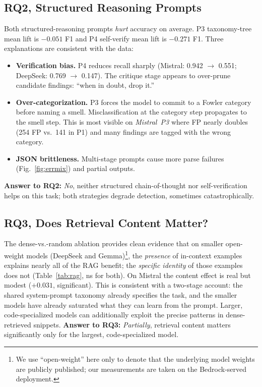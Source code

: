 \documentclass[conference]{IEEEtran}
\begin{document}
\subsection{RQ2, Structured Reasoning Prompts}
Both structured-reasoning prompts \emph{hurt} accuracy on average. P3
taxonomy-tree mean lift is $-0.051$ F1 and P4 self-verify mean lift is $-0.271$
F1. Three explanations are consistent with the data:
\begin{itemize}
 \item \textbf{Verification bias.} P4 reduces recall sharply
 (Mistral: 0.942 $\to$ 0.551; DeepSeek: 0.769 $\to$ 0.147). The critique
 stage appears to over-prune candidate findings: ``when in doubt, drop it.''
 \item \textbf{Over-categorization.} P3 forces the model to commit to a
 Fowler category before naming a smell. Misclassification at the category
 step propagates to the smell step. This is most visible on
 \textit{Mistral~P3} where FP nearly doubles (254 FP vs.\ 141 in P1) and
 many findings are tagged with the wrong category.
 \item \textbf{JSON brittleness.} Multi-stage prompts cause more parse
 failures (Fig.~\ref{fig:errmix}) and partial outputs.
\end{itemize}
\noindent\textbf{Answer to RQ2:} \emph{No}, neither structured chain-of-thought
nor self-verification helps on this task; both strategies degrade detection,
sometimes catastrophically.

\subsection{RQ3, Does Retrieval Content Matter?}
The dense-vs.-random ablation provides clean evidence that on smaller
open-weight models (DeepSeek and Gemma)\footnote{We use ``open-weight''
here only to denote that the underlying model weights are publicly
published; our measurements are taken on the Bedrock-served deployment.},
the \emph{presence} of in-context
examples explains nearly all of the RAG benefit; the \emph{specific identity}
of those examples does not (Table~\ref{tab:rag}, ns for both). On Mistral the
content effect is real but modest ($+0.031$, significant). This is consistent
with a two-stage account: the shared system-prompt taxonomy already specifies
the task, and the smaller models have already saturated what they can learn
from the prompt. Larger, code-specialized models can additionally exploit the
precise patterns in dense-retrieved snippets. \textbf{Answer to RQ3:}
\emph{Partially}, retrieval content matters significantly only for the
largest, code-specialized model.
\end{document}
